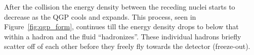 

After the collision the energy density between the receding nuclei starts to decrease as the QGP cools and expands.
This process, seen in Figure~\ref{fig:qgp_form}, continues till the energy density drops to below that within a hadron and the fluid ``hadronizes''.
These individual hadrons briefly scatter off of each other before they freely fly towards the detector (freeze-out).


